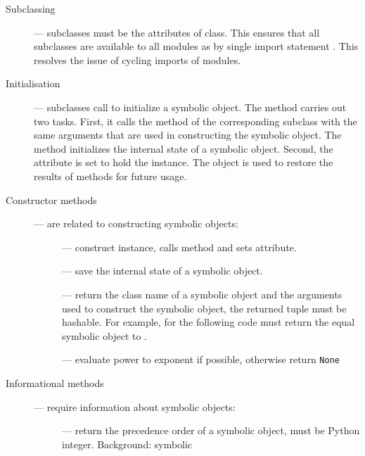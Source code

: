 \documentclass[a4paper,12pt]{article}
\renewcommand{\keyword}[1]{\texttt{\color{magenta}#1}}
\begin{document}
\begin{description}
\item[Subclassing] ---  subclasses must be the
  attributes of  class.  This ensures that all
   subclasses are available to all modules as
   by single import statement .  This resolves the issue of cycling
  imports of  modules.
\item[Initialisation] ---  subclasses call
   to initialize a symbolic
  object. The  method carries out two
  tasks. First, it calls the  method of the
  corresponding  subclass with the same arguments that
  are used in constructing the symbolic object.  The 
  method initializes the internal state of a symbolic object.  Second,
  the  attribute is set to hold the
   instance. The  object
  is used to restore the results of  methods for
  future usage.
\item[Constructor methods] --- are related to constructing symbolic
  objects:
  \begin{description}
  \item[] --- construct  instance,
    calls  method and sets  attribute.
  \item[] --- save the internal state of a symbolic
    object.
  \item[] --- return the class name of a symbolic object and
    the arguments used to construct the symbolic object, the returned
    tuple must be hashable. For example, for 
    the following code  must
    return the equal symbolic object to .
  \item[] --- evaluate power to exponent if
    possible, otherwise return \keyword{None}
  \end{description}
\item[Informational methods] --- require information about symbolic
  objects:
  \begin{description}
  \item[] --- return the precedence order of a
    symbolic object, must be Python integer. Background: symbolic

\end{description}
\end{description}
\end{document}
